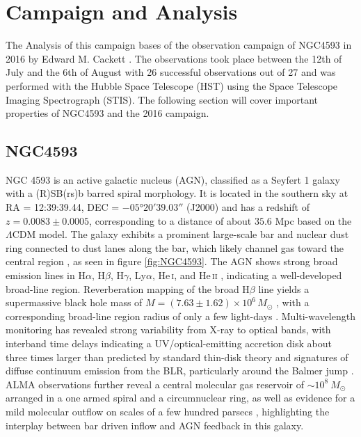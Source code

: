 \chapter{Campaign and Analysis}
\label{campaign_and_analysis}
The Analysis of this campaign bases of the observation campaign of NGC4593 in 2016 by Edward M. Cackett \parencite{cackett2018accretion}. The observations took place between the 12th of July and the 6th of August with 26 successful observations out of 27 and was performed with the Hubble Space Telescope (HST) using the Space Telescope Imaging Spectrograph (STIS). The following section will cover important properties of NGC4593 and the 2016 campaign.

\section{NGC4593}
\label{NGC4593}

NGC 4593 is an active galactic nucleus (AGN), classified as a Seyfert 1 galaxy with a \mbox{(R)SB(rs)b} barred spiral morphology. 
It is located in the southern sky at RA = 12:39:39.44, DEC = $-05$°$ 20' 39.03''$ (J2000) and has a redshift of $z = 0.0083 \pm 0.0005$, corresponding to a distance of about $35.6$ Mpc \parencite{simbaNGC4593} based on the $\Lambda$CDM model. 
The galaxy exhibits a prominent large-scale bar and nuclear dust ring connected to dust lanes along the bar, which likely channel gas toward the central region \parencite{mulchaey1997structure}, as seen in figure \ref{fig:NGC4593}. 
The AGN shows strong broad emission lines in  H$\alpha$,  H$\beta$,  H$\gamma$, Ly$\alpha$, He\,\textsc{i}, and He\,\textsc{ii} \parencite{bentz2015agn}, indicating a well-developed broad-line region. 
Reverberation mapping of the broad H$\beta$ line yields a supermassive black hole mass of $M = \left(7.63 \pm 1.62\right) \times 10^6\,M_\odot$ \parencite{bentz2015agn}, with a corresponding broad-line region radius of only a few light-days \parencite{denney2006ngc4593}. 
Multi-wavelength monitoring has revealed strong variability from X-ray to optical bands, with interband time delays indicating a UV/optical-emitting accretion disk about three times larger than predicted by standard thin-disk theory and signatures of diffuse continuum emission from the BLR, particularly around the Balmer jump \parencite{cackett2018accretion}. 
ALMA observations further reveal a central molecular gas reservoir of $\sim 10^8 \ M_\odot$ arranged in a one armed spiral and a circumnuclear ring, as well as evidence for a mild molecular outflow on scales of a few hundred parsecs \parencite{garcia2019alma}, highlighting the interplay between bar driven inflow and AGN feedback in this galaxy. 

